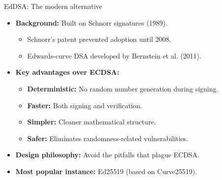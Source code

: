 \documentclass[aspectratio=169, lualatex, handout]{beamer}
\begin{document}
\begin{frame}{EdDSA: The modern alternative}
	\begin{itemize}
		\item \textbf{Background:} Built on Schnorr signatures (1989).
		      \begin{itemize}
			      \item Schnorr's patent prevented adoption until 2008.
			      \item Edwards-curve DSA developed by Bernstein et al. (2011).
		      \end{itemize}
		\item \textbf{Key advantages over ECDSA:}
		      \begin{itemize}
			      \item \textbf{Deterministic:} No random number generation during signing.
			      \item \textbf{Faster:} Both signing and verification.
			      \item \textbf{Simpler:} Cleaner mathematical structure.
			      \item \textbf{Safer:} Eliminates randomness-related vulnerabilities.
		      \end{itemize}
		\item \textbf{Design philosophy:} Avoid the pitfalls that plague ECDSA.
		\item \textbf{Most popular instance:} Ed25519 (based on Curve25519).
	\end{itemize}
\end{frame}
\end{document}
